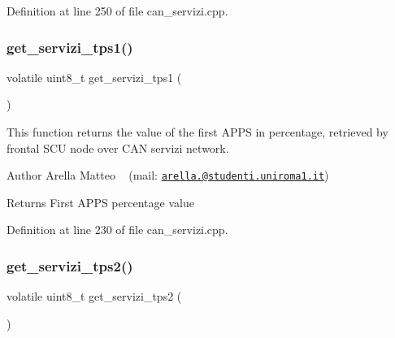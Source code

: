 Definition at line 250 of file can\+\_\+servizi.\+cpp.

\mbox{\label{group___c_a_n__servizi__group_gac899876f81f391e2daafcd8b22d2f32e}} 
\subsubsection{\texorpdfstring{get\+\_\+servizi\+\_\+tps1()}{get\_servizi\_tps1()}}
{\footnotesize\ttfamily volatile uint8\+\_\+t get\+\_\+servizi\+\_\+tps1 (\begin{DoxyParamCaption}{ }\end{DoxyParamCaption})}



This function returns the value of the first A\+P\+PS in percentage, retrieved by frontal S\+CU node over C\+AN servizi network. 

\begin{DoxyAuthor}{Author}
Arella Matteo ~\newline
 (mail\+: \href{mailto:arella.1646983@studenti.uniroma1.it}{\tt arella.@studenti.\+uniroma1.\+it})
\end{DoxyAuthor}
\begin{DoxyReturn}{Returns}
First A\+P\+PS percentage value 
\end{DoxyReturn}


Definition at line 230 of file can\+\_\+servizi.\+cpp.

\mbox{\label{group___c_a_n__servizi__group_ga431b31efe978864b1a2db0d57a5b572a}} 
\subsubsection{\texorpdfstring{get\+\_\+servizi\+\_\+tps2()}{get\_servizi\_tps2()}}
{\footnotesize\ttfamily volatile uint8\+\_\+t get\+\_\+servizi\+\_\+tps2 (\begin{DoxyParamCaption}{ }\end{DoxyParamCaption})}




